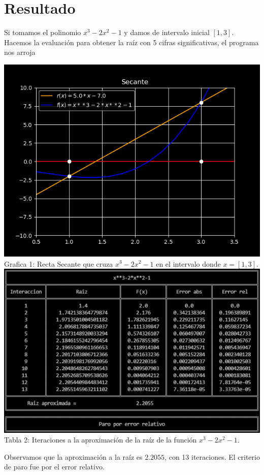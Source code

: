 \documentclass[12pt]{article}
\begin{document}
		
		\section*{\centering Resultado}\label{sec:Resultado}
			Si tomamos el polinomio $ x^3-2x^2-1 $ y damos de intervalo inicial $ [1,3] $. Hacemos 
			la evaluación para obtener la raíz con 5 cifras significativas, el programa nos arroja
			\begin{multicols}{2}
				\begin{center}
					\includegraphics[width=\linewidth]{Grafica 1.png}
					Grafica 1: Recta Secante que cruza $ x^3-2x^2-1 $ \columnbreak en el intervalo donde $ x = [1,3] $.\\
					\includegraphics[width=\linewidth]{Tabla 1.png}
					Tabla 2: Iteraciones a la aproximación de la raíz de la función $ x^3-2x^2-1 $.
				\end{center}
			\end{multicols}
			Observamos que la aproximación a la raíz es $ 2.2055 $, con 13 iteraciones. El criterio de paro fue 
			por el error relativo.
\end{document}
